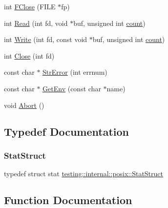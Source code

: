\begin{DoxyCompactItemize}
int \mbox{\hyperlink{namespacetesting_1_1internal_1_1posix_af4beeaaa8d62916d5e3b644a1ddfbd6b}{F\+Close}} (F\+I\+LE $\ast$fp)
\item 
int \mbox{\hyperlink{namespacetesting_1_1internal_1_1posix_a3c6ab13e581a56f1b02f3eb7536c97fd}{Read}} (int fd, void $\ast$buf, unsigned int \mbox{\hyperlink{gmock__stress__test_8cc_afd9db40e3361ae09188795e8cbe19752}{count}})
\item 
int \mbox{\hyperlink{namespacetesting_1_1internal_1_1posix_af4acf9f78d55f815a18b43786511abef}{Write}} (int fd, const void $\ast$buf, unsigned int \mbox{\hyperlink{gmock__stress__test_8cc_afd9db40e3361ae09188795e8cbe19752}{count}})
\item 
int \mbox{\hyperlink{namespacetesting_1_1internal_1_1posix_a15e5b8f2a535ef1b2529b85b861e4846}{Close}} (int fd)
\item 
const char $\ast$ \mbox{\hyperlink{namespacetesting_1_1internal_1_1posix_a4b77b14af6f4d18f83d303b98e9349c4}{Str\+Error}} (int errnum)
\item 
const char $\ast$ \mbox{\hyperlink{namespacetesting_1_1internal_1_1posix_a1d5e3da5a27eed25986859fa83cafe95}{Get\+Env}} (const char $\ast$name)
\item 
void \mbox{\hyperlink{namespacetesting_1_1internal_1_1posix_a69b8278c59359dd6a6f941b4643db9fb}{Abort}} ()
\end{DoxyCompactItemize}


\subsection{Typedef Documentation}
\mbox{\label{namespacetesting_1_1internal_1_1posix_a8eb9f08d3af29941c2d2a964cfff3ecb}} 
\subsubsection{\texorpdfstring{StatStruct}{StatStruct}}
{\footnotesize\ttfamily typedef struct stat \mbox{\hyperlink{namespacetesting_1_1internal_1_1posix_a8eb9f08d3af29941c2d2a964cfff3ecb}{testing\+::internal\+::posix\+::\+Stat\+Struct}}}



\subsection{Function Documentation}
\mbox{\label{namespacetesting_1_1internal_1_1posix_a69b8278c59359dd6a6f941b4643db9fb}} 
